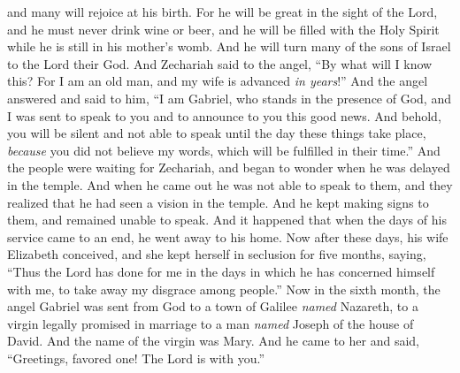 \begin{biblechapter}
and many will rejoice at his birth.
\verse For he will be great in the sight of the Lord, 
and he must never drink wine or beer, 
and he will be filled with the Holy Spirit 
while he is still in his mother’s womb.
\verse And he will turn many of the sons of Israel 
to the Lord their God.
\verse And Zechariah said to the angel, “By what will I know this? For I am an old man, and my wife is advanced \textit{in years}!”
\verse And the angel answered and said to him, “I am Gabriel, who stands in the presence of God, and I was sent to speak to you and to announce to you this good news.
\verse And behold, you will be silent and not able to speak until the day these things take place, \textit{because} you did not believe my words, which will be fulfilled in their time.”
\verse And the people were waiting for Zechariah, and began to wonder when he was delayed in the temple.
\verse And when he came out he was not able to speak to them, and they realized that he had seen a vision in the temple. And he kept making signs to them, and remained unable to speak.
\verse And it happened that when the days of his service came to an end, he went away to his home.
\verse Now after these days, his wife Elizabeth conceived, and she kept herself in seclusion for five months, saying,
\verse “Thus the Lord has done for me in the days in which he has concerned himself with me, to take away my disgrace among people.”
 Now in the sixth month, the angel Gabriel was sent from God to a town of Galilee \textit{named} Nazareth,
\verse to a virgin legally promised in marriage to a man \textit{named} Joseph of the house of David. And the name of the virgin was Mary.
\verse And he came to her and said, “Greetings, favored one! The Lord is with you.”

\end{biblechapter}
